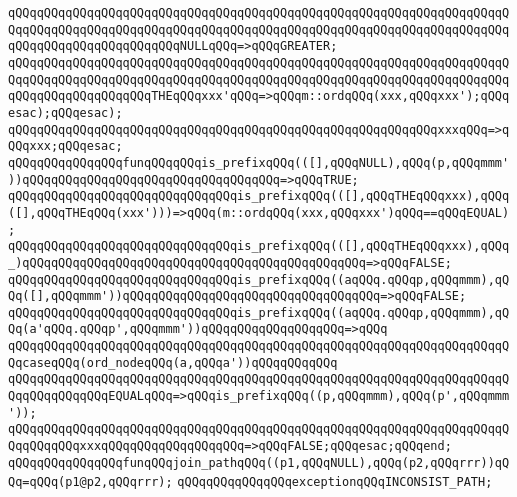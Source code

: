 \verb|qQQqqQQqqQQqqQQqqQQqqQQqqQQqqQQqqQQqqQQqqQQqqQQqqQQqqQQqqQQqqQQqqQQqqQQqqQQqqQQqqQQqqQQqqQQqqQQqqQQqqQQqqQQqqQQqqQQqqQQqqQQqqQQqqQQqqQQqqQQqqQQqqQQqqQQqqQQqqQQqqQQqNULLqQQq=>qQQqGREATER;|\newline
\verb|qQQqqQQqqQQqqQQqqQQqqQQqqQQqqQQqqQQqqQQqqQQqqQQqqQQqqQQqqQQqqQQqqQQqqQQqqQQqqQQqqQQqqQQqqQQqqQQqqQQqqQQqqQQqqQQqqQQqqQQqqQQqqQQqqQQqqQQqqQQqqQQqqQQqqQQqqQQqqQQqTHEqQQqxxx'qQQq=>qQQqm::ordqQQq(xxx,qQQqxxx');qQQqesac);qQQqesac);|\newline
\verb|qQQqqQQqqQQqqQQqqQQqqQQqqQQqqQQqqQQqqQQqqQQqqQQqqQQqqQQqqQQqxxxqQQq=>qQQqxxx;qQQqesac;|\newline
\newline
\newline
\verb|qQQqqQQqqQQqqQQqfunqQQqqQQqis_prefixqQQq(([],qQQqNULL),qQQq(p,qQQqmmm'))qQQqqQQqqQQqqQQqqQQqqQQqqQQqqQQqqQQq=>qQQqTRUE;|\newline
\verb|qQQqqQQqqQQqqQQqqQQqqQQqqQQqqQQqis_prefixqQQq(([],qQQqTHEqQQqxxx),qQQq([],qQQqTHEqQQq(xxx')))=>qQQq(m::ordqQQq(xxx,qQQqxxx')qQQq==qQQqEQUAL);|\newline
\verb|qQQqqQQqqQQqqQQqqQQqqQQqqQQqqQQqis_prefixqQQq(([],qQQqTHEqQQqxxx),qQQq_)qQQqqQQqqQQqqQQqqQQqqQQqqQQqqQQqqQQqqQQqqQQqqQQq=>qQQqFALSE;|\newline
\verb|qQQqqQQqqQQqqQQqqQQqqQQqqQQqqQQqis_prefixqQQq((aqQQq.qQQqp,qQQqmmm),qQQq([],qQQqmmm'))qQQqqQQqqQQqqQQqqQQqqQQqqQQqqQQqqQQq=>qQQqFALSE;|\newline
\verb|qQQqqQQqqQQqqQQqqQQqqQQqqQQqqQQqis_prefixqQQq((aqQQq.qQQqp,qQQqmmm),qQQq(a'qQQq.qQQqp',qQQqmmm'))qQQqqQQqqQQqqQQqqQQq=>qQQq|\newline
\verb|qQQqqQQqqQQqqQQqqQQqqQQqqQQqqQQqqQQqqQQqqQQqqQQqqQQqqQQqqQQqqQQqqQQqqQQqcaseqQQq(ord_nodeqQQq(a,qQQqa'))qQQqqQQqqQQq|\newline
\verb|qQQqqQQqqQQqqQQqqQQqqQQqqQQqqQQqqQQqqQQqqQQqqQQqqQQqqQQqqQQqqQQqqQQqqQQqqQQqqQQqqQQqEQUALqQQq=>qQQqis_prefixqQQq((p,qQQqmmm),qQQq(p',qQQqmmm'));|\newline
\verb|qQQqqQQqqQQqqQQqqQQqqQQqqQQqqQQqqQQqqQQqqQQqqQQqqQQqqQQqqQQqqQQqqQQqqQQqqQQqqQQqxxxqQQqqQQqqQQqqQQqqQQq=>qQQqFALSE;qQQqesac;qQQqend;|\newline
\newline
\newline
\verb|qQQqqQQqqQQqqQQqfunqQQqjoin_pathqQQq((p1,qQQqNULL),qQQq(p2,qQQqrrr))qQQq=qQQq(p1@p2,qQQqrrr);|\newline
\newline
\verb|qQQqqQQqqQQqqQQqexceptionqQQqINCONSIST_PATH;|\newline
